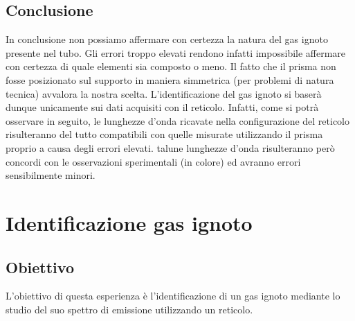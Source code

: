 \documentclass[a4paper]{article}
\begin{document}
\subsection{Conclusione}
In conclusione non possiamo affermare con certezza la natura del gas ignoto presente nel tubo. Gli errori troppo elevati rendono infatti impossibile affermare con certezza di quale elementi sia composto o meno. Il fatto che il prisma non fosse posizionato sul supporto in maniera simmetrica (per problemi di natura tecnica) avvalora la nostra scelta. L'identificazione del gas ignoto si baserà dunque unicamente sui dati acquisiti con il reticolo. Infatti, come si potrà osservare in seguito, le lunghezze d'onda ricavate nella configurazione del reticolo risulteranno del tutto compatibili con quelle misurate utilizzando il prisma proprio a causa degli errori elevati. talune lunghezze d'onda risulteranno però concordi con le osservazioni sperimentali (in colore) ed avranno errori sensibilmente minori.
\section{Identificazione gas ignoto}
\subsection{Obiettivo}
L'obiettivo di questa esperienza è l'identificazione di un gas ignoto mediante lo studio del suo spettro di emissione utilizzando un reticolo.
\end{document}
